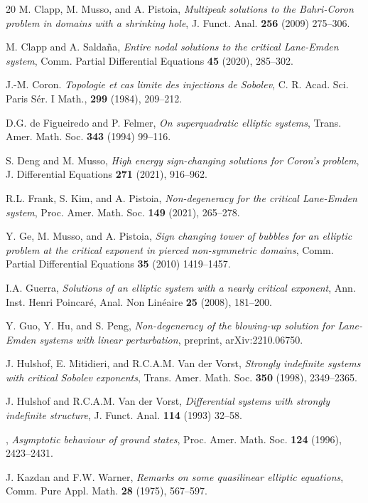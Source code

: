 \documentclass[reqno]{amsart}
\theoremstyle{remark}
\renewcommand{\(}{\left(}
\renewcommand{\)}{\right)}
\numberwithin{equation}{section}
\begin{document}
\begin{thebibliography}{20}
M. Clapp, M. Musso, and A. Pistoia, \textit{Multipeak solutions to the Bahri-Coron problem in domains with a shrinking hole}, J. Funct. Anal. \textbf{256} (2009) 275--306.

M. Clapp and A. Salda\~na, \textit{Entire nodal solutions to the critical Lane-Emden system}, Comm. Partial Differential Equations \textbf{45} (2020), 285--302.

J.-M. Coron. \textit{Topologie et cas limite des injections de Sobolev}, C. R. Acad. Sci. Paris S\'er. I Math., \textbf{299} (1984), 209--212.

D.G. de Figueiredo and P. Felmer, \textit{On superquadratic elliptic systems}, Trans. Amer. Math. Soc. \textbf{343} (1994) 99--116.

S. Deng and M. Musso, \textit{High energy sign-changing solutions for Coron's problem}, J. Differential Equations \textbf{271} (2021), 916--962.

R.L. Frank, S. Kim, and A. Pistoia, \textit{Non-degeneracy for the critical Lane-Emden system}, Proc. Amer. Math. Soc. \textbf{149} (2021), 265--278.

Y. Ge, M. Musso, and A. Pistoia, \textit{Sign changing tower of bubbles for an elliptic problem at the critical exponent in pierced non-symmetric domains}, Comm. Partial Differential Equations \textbf{35} (2010) 1419--1457.

I.A. Guerra, \textit{Solutions of an elliptic system with a nearly critical exponent}, Ann. Inst. Henri Poincar\'e, Anal. Non Lin\'eaire \textbf{25} (2008), 181--200.

Y. Guo, Y. Hu, and S. Peng, \textit{Non-degeneracy of the blowing-up solution for Lane-Emden systems with linear perturbation}, preprint, arXiv:2210.06750.

J. Hulshof, E. Mitidieri, and R.C.A.M. Van der Vorst, \textit{Strongly indefinite systems with critical Sobolev exponents}, Trans. Amer. Math. Soc. \textbf{350} (1998), 2349--2365.

J. Hulshof and R.C.A.M. Van der Vorst, \textit{Differential systems with strongly indefinite structure}, J. Funct. Anal. \textbf{114} (1993) 32--58.

\bysame, \textit{Asymptotic behaviour of ground states}, Proc. Amer. Math. Soc. \textbf{124} (1996), 2423--2431.

J. Kazdan and F.W. Warner, \textit{Remarks on some quasilinear elliptic equations}, Comm. Pure Appl. Math. \textbf{28} (1975), 567--597.


\end{thebibliography}
\end{document}
